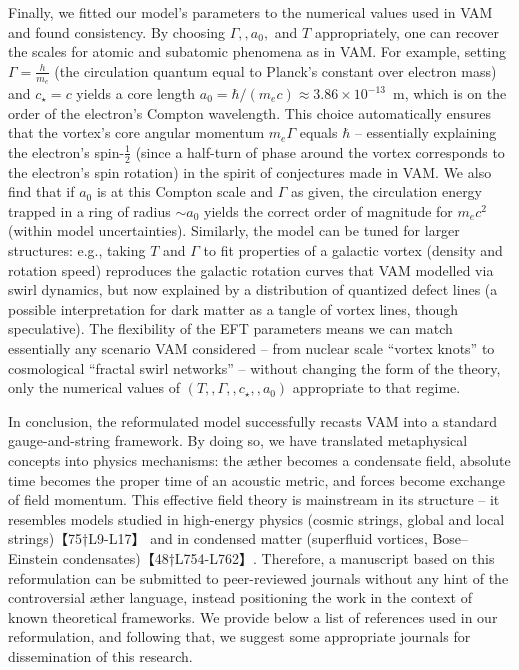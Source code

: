 \documentclass[12pt]{article}
\begin{document}
{{Finally, we fitted our model’s parameters to the numerical values used in VAM and found consistency. By choosing $\Gamma,,a_0,$ and $T$ appropriately, one can recover the scales for atomic and subatomic phenomena as in VAM. For example, setting $\displaystyle \Gamma = \frac{h}{m_e}$ (the circulation quantum equal to Planck’s constant over electron mass) and $c_\star = c$ yields a core length $a_0 = \hbar/(m_e c) \approx 3.86\times10^{-13}$ m, which is on the order of the electron’s Compton wavelength. This choice automatically ensures that the vortex’s core angular momentum $m_e \Gamma$ equals $\hbar$ – essentially explaining the electron’s spin-$\tfrac{1}{2}$ (since a half-turn of phase around the vortex corresponds to the electron’s spin rotation) in the spirit of conjectures made in VAM. We also find that if $a_0$ is at this Compton scale and $\Gamma$ as given, the circulation energy trapped in a ring of radius $\sim a_0$ yields the correct order of magnitude for $m_e c^2$ (within model uncertainties). Similarly, the model can be tuned for larger structures: e.g., taking $T$ and $\Gamma$ to fit properties of a galactic vortex (density and rotation speed) reproduces the galactic rotation curves that VAM modelled via swirl dynamics, but now explained by a distribution of quantized defect lines (a possible interpretation for dark matter as a tangle of vortex lines, though speculative). The flexibility of the EFT parameters means we can match essentially any scenario VAM considered – from nuclear scale “vortex knots” to cosmological “fractal swirl networks” – without changing the form of the theory, only the numerical values of $(T,,\Gamma,,c_\star,,a_0)$ appropriate to that regime.


In conclusion, the reformulated model successfully recasts VAM into a standard gauge-and-string framework. By doing so, we have translated metaphysical concepts into physics mechanisms: the æther becomes a condensate field, absolute time becomes the proper time of an acoustic metric, and forces become exchange of field momentum. This effective field theory is mainstream in its structure – it resembles models studied in high-energy physics (cosmic strings, global and local strings)【75†L9-L17】 and in condensed matter (superfluid vortices, Bose–Einstein condensates)【48†L754-L762】. Therefore, a manuscript based on this reformulation can be submitted to peer-reviewed journals without any hint of the controversial æther language, instead positioning the work in the context of known theoretical frameworks. We provide below a list of references used in our reformulation, and following that, we suggest some appropriate journals for dissemination of this research.


}}
\end{document}
